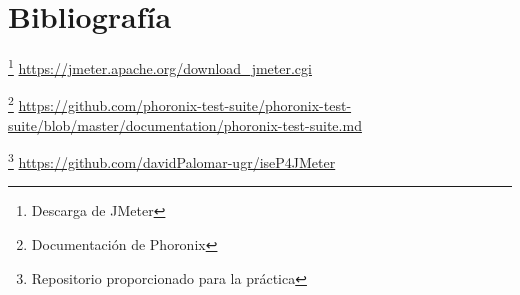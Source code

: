 \newpage
\section{Bibliografía}

\footnote{Descarga de JMeter}
\textcolor{blue}{\url{https://jmeter.apache.org/download_jmeter.cgi}}

\footnote{Documentación de Phoronix}
\textcolor{blue}{\url{https://github.com/phoronix-test-suite/phoronix-test-suite/blob/master/documentation/phoronix-test-suite.md}}

\footnote{Repositorio proporcionado para la práctica}
\textcolor{blue}{\url{https://github.com/davidPalomar-ugr/iseP4JMeter}}
